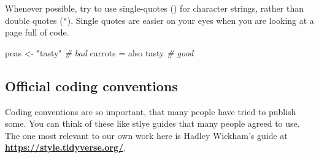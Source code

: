 \documentclass[
]{book}
\newenvironment{Shaded}{\begin{snugshade}}{\end{snugshade}}
\newcommand{\CommentTok}[1]{\textcolor[rgb]{0.56,0.35,0.01}{\textit{#1}}}
\newcommand{\NormalTok}[1]{#1}
\newcommand{\OtherTok}[1]{\textcolor[rgb]{0.56,0.35,0.01}{#1}}
\newcommand{\StringTok}[1]{\textcolor[rgb]{0.31,0.60,0.02}{#1}}
\begin{document}
Whenever possible, try to use single-quotes (\texttt{\textquotesingle{}}) for character strings, rather than double quotes (\texttt{"}). Single quotes are easier on your eyes when you are looking at a page full of code.

\begin{Shaded}
\begin{Highlighting}[]
\NormalTok{peas }\OtherTok{\textless{}{-}} \StringTok{"tasty"} \CommentTok{\# bad}
\NormalTok{carrots }\OtherTok{=} \StringTok{\textquotesingle{}also tasty\textquotesingle{}} \CommentTok{\# good}
\end{Highlighting}
\end{Shaded}

\hypertarget{official-coding-conventions}{%
\subsection{Official coding conventions}\label{official-coding-conventions}}

Coding conventions are so important, that many people have tried to publish some. You can think of these like stlye guides that many people agreed to use. The one most relevant to our own work here is Hadley Wickham's guide at \href{https://style.tidyverse.org/}{\textbf{https://style.tidyverse.org/}}.

  
\end{document}
